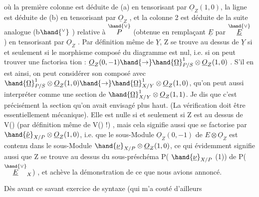 où la première colonne est déduite de (a) en tensorisant par $\underline{O}_Z(1,0)$,
la ligne est déduite de  (b) en tensorisant par $\underline{O}_Z$  , et la colonne 2
est déduite  de la  suite analogue  (b$\hand{^\vee}$ ) relative à $\overset{\hand{\vee}}{P}$  (obtenue
en remplaçant $\underline{E}$ par $\overset{\hand{\vee}}{\underline{E}}$ )  en tensorisant par $\underline{O}_Z$ . Par définition même
de $\underline{Y}$, Z se trouve au dessus de $\underline{Y}$  si et seulement si le morphisme
composé \hand{$\alpha$} du diagramme est nul, i.e.  si on peut trouver une  factorisa
tion \hand{$\beta$}: $\underline{O}_Z(0,-1) \hand{\rightarrow} \hand{\underline{\Omega}}^1_{P/S}\otimes \underline{O}_Z(1,0)$ .  S'il en est ainsi, on  peut
considérer  son composé avec  $\hand{\underline{\Omega}}^1_{P/S} \otimes \underline{O}_Z(1,0) \hand{\rightarrow} \hand{\underline{\Omega}}^1_{X/Y} \otimes \underline{O}_Z(1,0)$,
qu'on peut aussi interpréter comme une section de $\hand{\underline{\Omega}}^1_{X/Y}\otimes \underline{O}_Z(1,1)$.
Je dis que c'est précisément la section \inserted{$\mu$} qu'on avait envisagé plus haut.
(La vérification doit être essentiellement mécanique).  Elle est
nulle  si et seulement si  Z est au dessus de V(\hand{$\mu$})  (par définition
même de V(\hand{$\mu$}) !) , mais cela signifie aussi  que \hand{$\beta$} se factorise par
$\hand{\check{\underline{\nu}}}_{X/P} \otimes \underline{O}_Z(1,0)$, i.e. que  le sous-Module $\underline{O}_Z(0,-1)$ de $E\otimes \underline{O}_Z$ est contenu
dans le sous-Module $\hand{\underline{\nu}}_{X/P} \otimes \underline{O}_Z(1,0)$,  ce qui évidemment signifie aussi
que  Z se trouve au dessus du sous-préschéma  P( $\hand{\underline{\nu}}_{X/P}$ (1)) de P($\overset{\hand{\vee}}{\underline{E}}_X$) , et
achève la démonstration de ce que nous avions annoncé.

Dès avant ce savant exercice de syntaxe (qui m'a couté d'ailleurs


